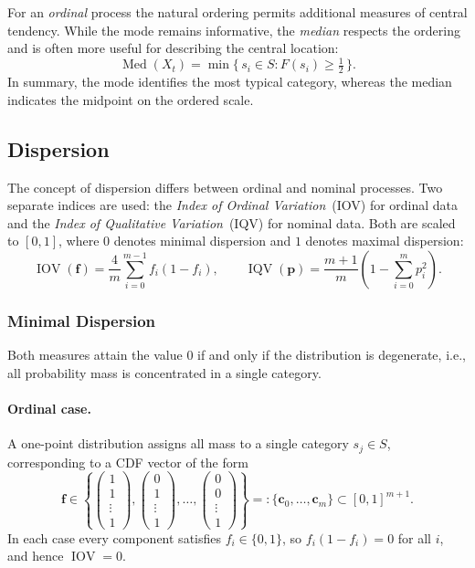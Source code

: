 \documentclass[12pt,a4paper]{scrreprt}
\DeclareMathOperator{\Med}{Med}
\DeclareMathOperator{\IOV}{IOV}
\DeclareMathOperator{\IQV}{IQV}
\begin{document}
For an \textit{ordinal} process the natural ordering permits additional measures of central
tendency. While the mode remains informative, the \emph{median} respects the ordering and is
often more useful for describing the central location:
\[
    \Med(X_t) = \min\bigl\{\, s_i \in S : F(s_i) \geq \tfrac{1}{2} \,\bigr\}.
\]
In summary, the mode identifies the most typical category, whereas the median indicates the
midpoint on the ordered scale.

\subsection{Dispersion}

The concept of dispersion differs between ordinal and nominal processes. Two separate indices
are used: the \emph{Index of Ordinal Variation}~(IOV) for ordinal data and the \emph{Index of
Qualitative Variation}~(IQV) for nominal data. Both are scaled to $[0,1]$, where $0$ denotes
minimal dispersion and $1$ denotes maximal dispersion:
\[
    \IOV(\mathbf{f})
    = \frac{4}{m}\sum_{i=0}^{m-1} f_i (1 - f_i),
    \qquad
    \IQV(\mathbf{p})
    = \frac{m+1}{m}\!\left(1 - \sum_{i=0}^{m} p_i^2\right).
\]

\subsubsection{Minimal Dispersion}

Both measures attain the value $0$ if and only if the distribution is degenerate, i.e., all
probability mass is concentrated in a single category.

\paragraph{Ordinal case.}
A one-point distribution assigns all mass to a single category $s_j \in S$, corresponding to
a CDF vector of the form
\[
    \mathbf{f} \in
    \left\{
    \begin{pmatrix} 1 \\ 1 \\ \vdots \\ 1 \end{pmatrix},
    \begin{pmatrix} 0 \\ 1 \\ \vdots \\ 1 \end{pmatrix},
    \ldots,
    \begin{pmatrix} 0 \\ 0 \\ \vdots \\ 1 \end{pmatrix}
    \right\}
    =: \{\mathbf{c}_0,\ldots,\mathbf{c}_m\} \subset [0,1]^{m+1}.
\]
In each case every component satisfies $f_i \in \{0,1\}$, so $f_i(1-f_i) = 0$ for all $i$,
and hence $\IOV = 0$.
\end{document}
